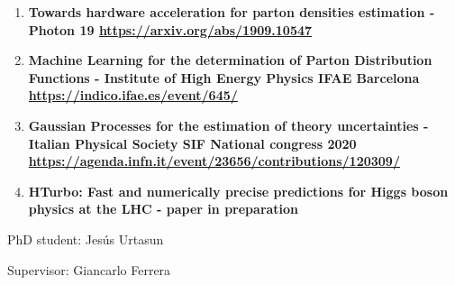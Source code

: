 \documentclass[12pt]{article}
\begin{document}
\begin{enumerate}{\leftmargin 15pt \itemsep 0pt \topsep 3pt}
	\item{\bf Towards hardware acceleration for parton densities estimation - Photon 19 \href{https://arxiv.org/abs/1909.10547}{https://arxiv.org/abs/1909.10547}}
	\item{\bf Machine Learning for the determination of Parton Distribution
		Functions - Institute of High Energy Physics IFAE Barcelona \\ \href{https://indico.ifae.es/event/645/}{https://indico.ifae.es/event/645/}}
	\item{\bf Gaussian Processes for the estimation of theory uncertainties - Italian Physical Society SIF National congress 2020\\ \href{https://agenda.infn.it/event/23656/contributions/120309/}{https://agenda.infn.it/event/23656/contributions/120309/}}
	\item {\bf HTurbo: Fast and numerically precise predictions for Higgs boson physics at the LHC - paper in preparation}
\end{enumerate}

\newpage


\hspace{2cm}


PhD student: Jesús Urtasun\\

\hspace{2cm}

\indent Supervisor: Giancarlo Ferrera
\end{document}
